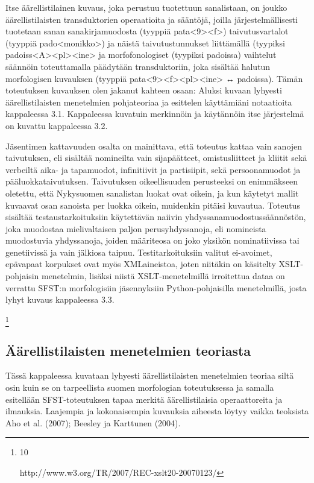 \documentclass[free]{flammie}
\begin{document}
Itse äärellistilainen kuvaus, joka perustuu tuotettuun sanalistaan, on joukko
äärellistilaisten transduktorien operaatioita ja sääntöjä, joilla järjestelmällisesti tuotetaan sanan sanakirjamuodosta (tyyppiä pata<9><f>) taivutusvartalot
(tyyppiä pado<monikko>) ja näistä taivutustunnukset liittämällä (tyypiksi
padoiss<A><pl><ine> ja morfofonologiset (tyypiksi padoissa) vaihtelut
säännöin toteuttamalla päädytään transduktoriin, joka sisältää halutun morfologisen kuvauksen (tyyppiä pata<9><f><pl><ine> ↔ padoissa). Tämän
toteutuksen kuvauksen olen jakanut kahteen osaan: Aluksi kuvaan lyhyesti äärellistilaisten menetelmien pohjateoriaa ja esittelen käyttämiäni notaatioita kappaleessa 3.1. Kappaleessa kuvatuin merkinnöin ja käytännöin itse järjestelmä on
kuvattu kappaleessa 3.2.

Jäsentimen kattavuuden osalta on mainittava, että toteutus kattaa vain sanojen taivutuksen, eli sisältää nomineilta vain sijapäätteet, omistusliitteet ja kliitit sekä verbeiltä aika- ja tapamuodot, infinitiivit ja partisiipit, sekä persoonamuodot ja pääluokkataivutuksen. Taivutuksen oikeellisuuden perusteeksi on enimmäkseen oletettu, että Nykysuomen sanalistan luokat ovat oikein, ja kun käytetyt mallit kuvaavat osan sanoista per luokka oikein, muidenkin pitäisi kuvautua. Toteutus sisältää testaustarkoituksiin käytettävän naiivin yhdyssanamuodostussäännöstön, joka
muodostaa mielivaltaisen paljon perusyhdyssanoja, eli nomineista muodostuvia
yhdyssanoja, joiden määriteosa on joko yksikön nominatiivissa tai genetiivissä ja
vain jälkiosa taipuu.
Testitarkoituksiin valitut ei-avoimet, epävapaat korpukset ovat myös XMLaineistoa, joten niitäkin on käsitelty XSLT-pohjaisin menetelmin, lisäksi niistä
XSLT-menetelmillä irroitettua dataa on verrattu SFST:n morfologisiin jäsennyksiin Python-pohjaisilla menetelmillä, josta lyhyt kuvaus kappaleessa 3.3.

\footnote{10

http://www.w3.org/TR/2007/REC-xslt20-20070123/
}


\subsection{Äärellistilaisten menetelmien teoriasta}

Tässä kappaleessa kuvataan lyhyesti äärellistilaisten menetelmien teoriaa siltä
osin kuin se on tarpeellista suomen morfologian toteutuksessa ja samalla esitellään SFST-toteutuksen tapaa merkitä äärellistilaisia operaattoreita ja ilmauksia.
Laajempia ja kokonaisempia kuvauksia aiheesta löytyy vaikka teoksista Aho et al.
(2007); Beesley ja Karttunen (2004).
\end{document}
